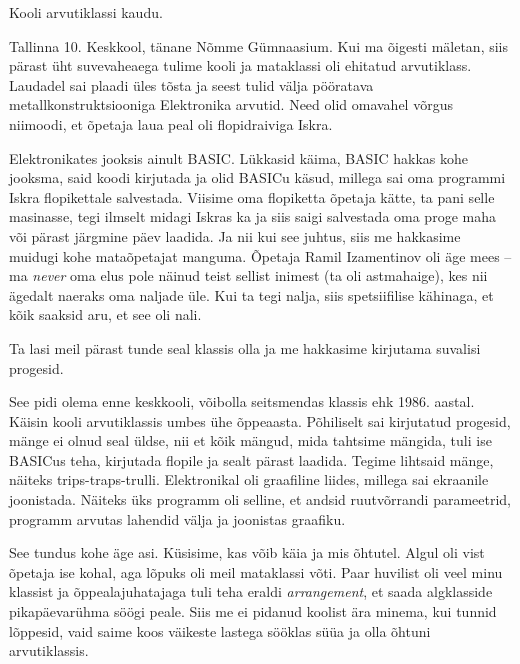 


Kooli arvutiklassi kaudu.


Tallinna 10. Keskkool, tänane Nõmme 
Gümnaasium. Kui ma 
õigesti mäletan, siis pärast üht suvevaheaega tulime kooli ja 
mataklassi oli ehitatud arvutiklass. Laudadel sai plaadi üles tõsta ja seest tulid 
välja pööratava metallkonstruktsiooniga 
Elektronika arvutid. Need olid omavahel võrgus 
niimoodi, et õpetaja laua peal oli flopidraiviga 
Iskra. 

Elektronikates jooksis ainult BASIC. 
Lükkasid käima, BASIC hakkas kohe jooksma, said koodi 
kirjutada ja olid BASICu käsud, millega sai oma programmi Iskra flopikettale salvestada. Viisime oma flopiketta õpetaja kätte, ta pani selle masinasse, tegi ilmselt midagi Iskras ka ja 
siis saigi salvestada oma proge maha või pärast järgmine päev laadida. Ja nii 
kui see juhtus, siis me hakkasime muidugi kohe mataõpetajat manguma. Õpetaja 
Ramil Izamentinov oli äge 
mees -- ma \emph{never} oma elus pole näinud teist sellist inimest (ta oli astmahaige), 
kes nii ägedalt naeraks oma naljade üle. Kui 
ta tegi nalja, siis spetsiifilise kähinaga, et kõik saaksid aru, et see oli nali. 

Ta lasi meil pärast tunde seal klassis olla ja me 
hakkasime kirjutama suvalisi progesid. 


See pidi olema enne keskkooli, võibolla seitsmendas 
klassis ehk 1986. aastal. Käisin kooli arvutiklassis 
umbes ühe õppeaasta. Põhiliselt sai kirjutatud progesid, 
mänge ei olnud seal üldse, nii et kõik mängud, mida 
tahtsime mängida, tuli ise BASICus teha, kirjutada flopile ja sealt pärast laadida. Tegime
lihtsaid mänge, näiteks trips-traps-trulli. Elektronikal oli graafiline liides, millega
sai ekraanile joonistada. Näiteks üks programm oli 
selline, et andsid ruutvõrrandi parameetrid, programm arvutas lahendid välja ja joonistas 
graafiku. 


See tundus kohe äge asi. Küsisime, kas 
võib käia ja mis õhtutel. Algul oli vist õpetaja ise kohal, 
aga lõpuks oli meil mataklassi võti. Paar huvilist 
oli veel minu klassist ja õppealajuhatajaga tuli teha eraldi \emph{arrangement}, et saada algklasside pikapäevarühma söögi 
peale. Siis me ei pidanud koolist ära minema, kui tunnid lõppesid, vaid saime koos
väikeste lastega sööklas süüa ja olla õhtuni arvutiklassis. 

